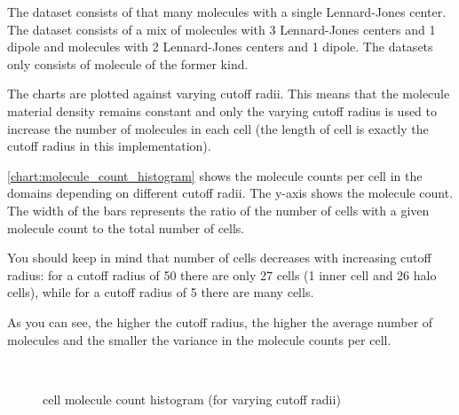 The  dataset consists of that many molecules with a single Lennard-Jones center.
The  dataset consists of a mix of molecules with 3 Lennard-Jones centers and 1 dipole and molecules with 2 Lennard-Jones centers and 1 dipole.
The  datasets only consists of molecule of the former kind.

The charts are plotted against varying cutoff radii. This means that the molecule material density remains constant and only the varying cutoff radius is used to increase the number of molecules in each cell (the length of cell is exactly the cutoff radius in this implementation).

\autoref{chart:molecule_count_histogram} shows the molecule counts per cell in the domains depending on different cutoff radii.
The y-axis shows the molecule count. The width of the bars represents the ratio of the number of cells with a given molecule count to the total number of cells.

You should keep in mind that number of cells decreases with increasing cutoff radius: for a cutoff radius of 50 there are only 27 cells (1 inner cell and 26 halo cells), while for a cutoff radius of 5 there are many cells.

As you can see, the higher the cutoff radius, the higher the average number of molecules and the smaller the variance in the molecule counts per cell.

\begin{figure}
\centering
{}
\\
\caption{cell molecule count histogram (for varying cutoff radii)}
\label{chart:molecule_count_histogram}
\end{figure}

